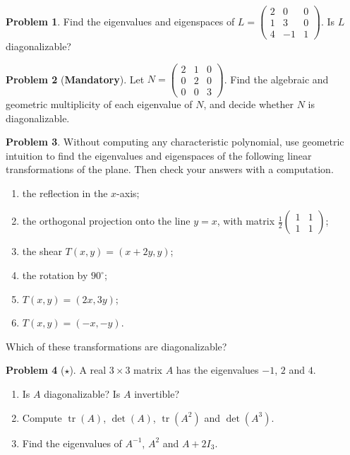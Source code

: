\documentclass[11pt]{article}
\theoremstyle{definition}
\newtheorem{problem}{Problem}[section]
\newcommand{\mandatory}{\textcolor{red!70!black}{\textbf{Mandatory}}}
\DeclareMathOperator{\tr}{tr}
\begin{document}
\begin{problem}\label{pr:eig-triangular}
    Find the eigenvalues and eigenspaces of $L = \begin{pmatrix} 2 & 0 & 0 \\ 1 & 3 & 0 \\ 4 & -1 & 1 \end{pmatrix}$. Is $L$ diagonalizable?
\end{problem}

\begin{problem}[\mandatory]\label{pr:eig-defective}
    Let $N = \begin{pmatrix} 2 & 1 & 0 \\ 0 & 2 & 0 \\ 0 & 0 & 3 \end{pmatrix}$. Find the algebraic and geometric multiplicity of each eigenvalue of $N$, and decide whether $N$ is diagonalizable.
\end{problem}

\begin{problem}\label{pr:eig-geometric}
    Without computing any characteristic polynomial, use geometric intuition to find the eigenvalues and eigenspaces of the following linear transformations of the plane. Then check your answers with a computation.
    \begin{enumerate}[label=(\alph*)]
        \item the reflection in the $x$-axis;
        \item the orthogonal projection onto the line $y = x$, with matrix $\frac{1}{2}\begin{pmatrix} 1 & 1 \\ 1 & 1 \end{pmatrix}$;
        \item the shear $T(x, y) = (x + 2y, y)$;
        \item the rotation by $90^\circ$;
        \item $T(x, y) = (2x, 3y)$;
        \item $T(x, y) = (-x, -y)$.
    \end{enumerate}
    Which of these transformations are diagonalizable?
\end{problem}

\begin{problem}[$\star$]\label{pr:eig-gre}
    A real $3 \times 3$ matrix $A$ has the eigenvalues $-1$, $2$ and $4$.
    \begin{enumerate}[label=(\alph*)]
        \item Is $A$ diagonalizable? Is $A$ invertible?
        \item Compute $\tr(A)$, $\det(A)$, $\tr(A^2)$ and $\det(A^3)$.
        \item Find the eigenvalues of $A^{-1}$, $A^2$ and $A + 2I_3$.
    \end{enumerate}
\end{problem}
\end{document}
